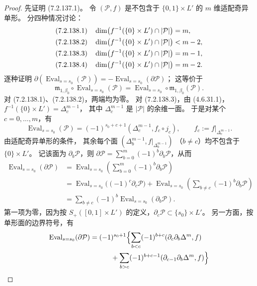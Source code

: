 \begin{proof}
先证明 (7.2.137.1)。
令 $(\mathcal P,f)$ 是不包含于
$\{0,1\}\times L'$ 的 $m$ 维适配奇异单形。
分四种情况讨论：
\begin{align*}
\textup{(7.2.138.1)}\quad&
\dim\bigl(f^{-1}(\{0\}\times L')\cap|\mathcal P|\bigr)=m,\\
\textup{(7.2.138.2)}\quad&
\dim\bigl(f^{-1}(\{0\}\times L')\cap|\mathcal P|\bigr)<m-2,\\
\textup{(7.2.138.3)}\quad&
\dim\bigl(f^{-1}(\{0\}\times L')\cap|\mathcal P|\bigr)=m-1,\\
\textup{(7.2.138.4)}\quad&
\dim\bigl(f^{-1}(\{0\}\times L')\cap|\mathcal P|\bigr)=m-2.
\end{align*}
逐种证明
$\partial(\operatorname{Eval}_{s=s_0}(\mathcal P))
=-\operatorname{Eval}_{s=s_0}(\partial\mathcal P)$；
这等价于
\[
\mathfrak m_{1,\beta_0}\circ
\operatorname{Eval}_{s=s_0}(\mathcal P)
=\operatorname{Eval}_{s=s_0}\circ
\mathfrak m_{1,\beta_0}(\mathcal P).
\]
对 (7.2.138.1)、(7.2.138.2)，两端均为零。
对 (7.2.138.3)，由 (4.6.31.1)，
$f^{-1}(\{0\}\times L')=\Delta_c^{m-1}$，
其中 $\Delta_c^{m-1}$ 是 $|\mathcal P|$ 的余维一面。
于是对某个 $c=0,\ldots,m$，有
\[
\operatorname{Eval}_{s=s_0}(\mathcal P)
=(-1)^{s_0+c+1}
(\Delta_c^{m-1},f_c\circ j_c),
\qquad f_c:=f|_{\Delta_c^{m-1}}.
\]
由适配奇异单形的条件，
其余每个面
$(\Delta_b^{m-1},f|_{\Delta_b^{m-1}})$
（$b\ne c$）均不包含于 $\{0\}\times L'$。
记该面为 $\partial_b\mathcal P$，则
$\partial\mathcal P=
\sum_{b=0}^{m}(-1)^b\partial_b\mathcal P$，从而
\[
\begin{aligned}
\operatorname{Eval}_{s=s_0}(\partial\mathcal P)
&=\operatorname{Eval}_{s=s_0}
\left(\sum_{b=0}^{m}(-1)^b\partial_b\mathcal P\right)\\
&=\operatorname{Eval}_{s=s_0}
\bigl((-1)^c\partial_c\mathcal P\bigr)
+\operatorname{Eval}_{s=s_0}
\left(\sum_{b\ne c}(-1)^b\partial_b\mathcal P\right)\\
&=\sum_{b\ne c}(-1)^b
\operatorname{Eval}_{s=s_0}(\partial_b\mathcal P).
\end{aligned}
\]
第一项为零，因为按 $S_+([0,1]\times L')$
的定义，$\partial_c\mathcal P\subset\{s_0\}\times L'$。
另一方面，按单形面的边界符号，有
\[
\begin{aligned}
\operatorname{Eval}_{s=s_0}(\partial\mathcal P)
&=(-1)^{s_0+1}
\Bigl\{\sum_{b<c}(-1)^{b+c}
(\partial_c\partial_b\Delta^m,f)\\
&\hspace{3em}+\sum_{b>c}(-1)^{b+c-1}
(\partial_{c-1}\partial_b\Delta^m,f)\Bigr\}\\

\end{aligned}\]
\end{proof}

